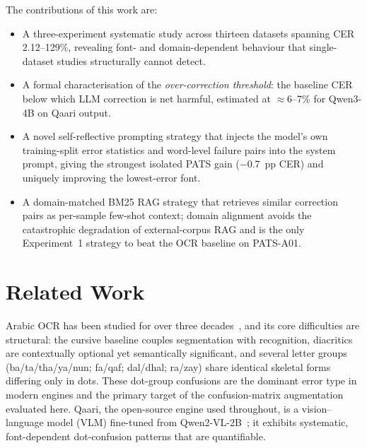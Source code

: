 \documentclass[conference]{IEEEtran}
\begin{document}
The contributions of this work are:
\begin{itemize}
\item A three-experiment systematic study across thirteen datasets spanning
      CER 2.12--129\%, revealing font- and domain-dependent behaviour that
      single-dataset studies structurally cannot detect.
\item A formal characterisation of the \emph{over-correction threshold}: the
      baseline CER below which LLM correction is net harmful, estimated at
      $\approx$6--7\% for Qwen3-4B on Qaari output.
\item A novel self-reflective prompting strategy that injects the model's own
      training-split error statistics and word-level failure pairs into the
      system prompt, giving the strongest isolated PATS gain ($-$0.7~pp CER)
      and uniquely improving the lowest-error font.
\item A domain-matched BM25 RAG strategy that retrieves similar correction
      pairs as per-sample few-shot context; domain alignment avoids the
      catastrophic degradation of external-corpus RAG and is the only
      Experiment~1 strategy to beat the OCR baseline on PATS-A01.
\end{itemize}

\section{Related Work}

Arabic OCR has been studied for over three decades~\cite{arabic_ocr_survey},
and its core difficulties are structural: the cursive baseline couples
segmentation with recognition, diacritics are contextually optional yet
semantically significant, and several letter groups (ba/ta/tha/ya/nun; fa/qaf;
dal/dhal; ra/zay) share identical skeletal forms differing only in dots. These
dot-group confusions are the dominant error type in modern engines and the
primary target of the confusion-matrix augmentation evaluated here. Qaari, the
open-source engine used throughout, is a vision--language model (VLM)
fine-tuned from Qwen2-VL-2B~\cite{qaari}; it exhibits systematic, font-dependent
dot-confusion patterns that are quantifiable.
\end{document}
